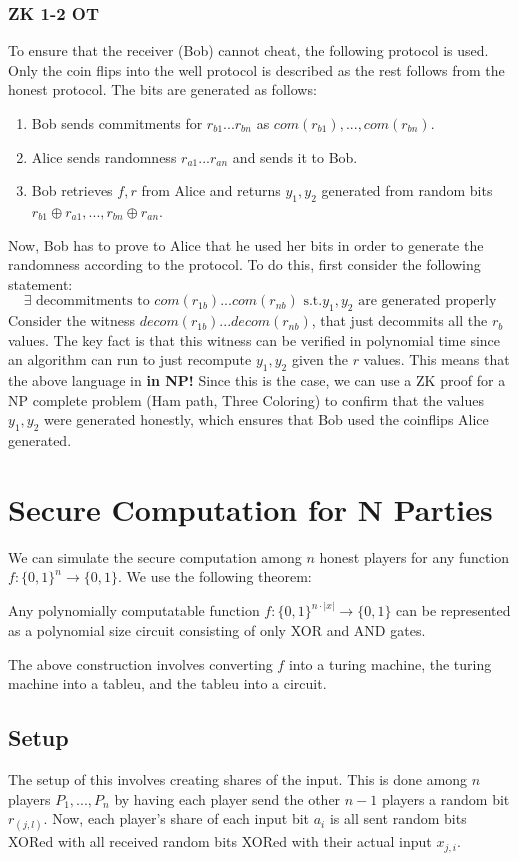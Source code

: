 \documentclass[11pt]{article}
\begin{document}
\subsubsection{ZK 1-2 OT}
To ensure that the receiver (Bob) cannot cheat, the following protocol is used. Only the coin flips into the well protocol is described as the rest follows from the honest protocol. The bits are generated as follows:
\begin{enumerate}
    \item Bob sends commitments for $r_{b1}...r_{bn}$ as $com(r_{b1}),...,com(r_{bn})$.
    \item Alice sends randomness $r_{a1}...r_{an}$ and sends it to Bob.
    \item Bob retrieves $f,r$ from Alice and returns $y_1,y_2$ generated from random bits $r_{b1} \oplus r_{a1},...,r_{bn} \oplus r_{an}$.
\end{enumerate}
Now, Bob has to prove to Alice that he used her bits in order to generate the randomness according to the protocol. To do this, first consider the following statement:
$$\exists \text{ decommitments to } com(r_{1b})...com(r_{nb}) \text{ s.t.} y_1, y_2 \text{ are generated properly}$$
Consider the witness $decom(r_{1b})...decom(r_{nb})$, that just decommits all the $r_b$ values. The key fact is that this witness can be verified in polynomial time since an algorithm can run to just recompute $y_1,y_2$ given the $r$ values. This means that the above language in \textbf{in NP!} Since this is the case, we can use a ZK proof for a NP complete problem (Ham path, Three Coloring) to confirm that the values $y_1, y_2$ were generated honestly, which ensures that Bob used the coinflips Alice generated.

\section{Secure Computation for N Parties}
We can simulate the secure computation among $n$ honest players for any function $f: \{0,1\}^{n} \rightarrow \{0,1\}$. We use the following theorem:
\bigskip

Any polynomially computatable function $f: \{0,1\}^{n \cdot |x|} \rightarrow \{0,1\}$ can be represented as a polynomial size circuit consisting of only XOR and AND gates.
\bigskip

The above construction involves converting $f$ into a turing machine, the turing machine into a tableu, and the tableu into a circuit.

\subsection{Setup}
The setup of this involves creating shares of the input. This is done among $n$ players $P_1,...,P_n$ by having each player send the other $n-1$ players a random bit $r_{(j,l)}$. Now, each player's share of each input bit $a_i$ is all sent random bits XORed with all received random bits XORed with their actual input $x_{j,i}$.
\end{document}
